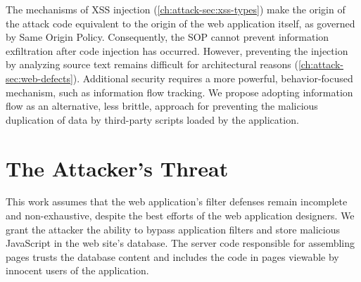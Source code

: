 

The mechanisms of XSS injection (\autoref{ch:attack-sec:xss-types}) make the origin of the attack code equivalent to the origin of the web application itself, as governed by Same Origin Policy.
Consequently, the SOP cannot prevent information exfiltration after code injection has occurred.
However, preventing the injection by analyzing source text remains difficult for architectural reasons (\autoref{ch:attack-sec:web-defects}).
Additional security requires a more powerful, behavior-focused mechanism, such as information flow tracking.
We propose adopting information flow as an alternative, less brittle, approach for preventing the malicious duplication of data by third-party scripts loaded by the application.

\section{The Attacker's Threat}\label{sec:defense-attackers-threat}

This work assumes that the web application's filter defenses remain incomplete and non-exhaustive, despite the best efforts of the web application designers.
We grant the attacker the ability to bypass application filters and store malicious JavaScript in the web site's database.
The server code responsible for assembling pages trusts the database content and includes the code in pages viewable by innocent users of the application.

